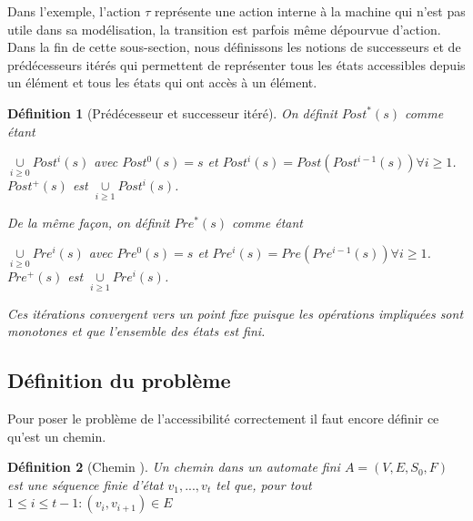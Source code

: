 \documentclass[a4paper]{report}
\theoremstyle{break}
\newtheorem{defin}{Définition}
\theoremstyle{breakplain}
\begin{document}
Dans l'exemple, l'action $\tau$ représente une action interne à la machine qui n'est pas utile dans sa modélisation, la transition est parfois même dépourvue d'action.\\

Dans la fin de cette sous-section, nous définissons les notions de successeurs et de prédécesseurs itérés qui permettent de représenter tous les états accessibles depuis un élément et tous les états qui ont accès à un élément.


\begin{defin}[Prédécesseur et successeur itéré\cite{baier2008principles}]
On définit $Post^*(s)$ comme étant 
\begin{center}$\underset{i \geq 0}{\cup} Post^i(s)$ avec $Post^0(s) = s$ et $Post^i(s) = Post(Post^{i-1}(s)) \forall i \geq 1$.\\
$Post^+(s)$ est $\underset{i \geq 1}{\cup} Post^i(s)$.
\end{center}
De la même façon, on définit $Pre^*(s)$ comme étant
\begin{center}
$\underset{i \geq 0}{\cup} Pre^i(s)$ avec $Pre^0(s) = s$ et $Pre^i(s) = Pre(Pre^{i-1}(s)) \forall i \geq 1$.\\
$Pre^+(s)$ est $\underset{i \geq 1}{\cup} Pre^i(s)$.
\end{center}

Ces itérations convergent vers un point fixe puisque les opérations impliquées sont monotones et que l'ensemble des états est fini.
\end{defin}

\subsection{Définition du problème}
Pour poser le problème de l'accessibilité correctement il faut encore définir ce qu'est un chemin.

\begin{defin}[Chemin \cite{geeraerts2013multiprocessor}]
Un chemin dans un automate fini $A = (V, E, S_0, F)$ est une séquence finie d'état $v_1, ..., v_t$ tel que, pour tout $1 \leq i \leq t-1 : (v_i, v_{i+1}) \in E$ 
\end{defin}
\end{document}
